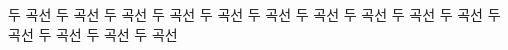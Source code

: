 \documentclass[preview]{standalone}
\begin{document}
\begin{center}
\parbox{10cm}{두 곡선 두 곡선 두 곡선 두 곡선 두 곡선 두 곡선 두 곡선 두 곡선 두 곡선 두 곡선 두 곡선 두 곡선 두 곡선 두 곡선}
\end{center}
\end{document}

